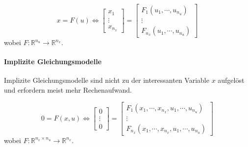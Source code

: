             \begin{equation*}
	            x = F(u) \iff
		            \begin{bmatrix}
			            x _ 1 \\
			            \vdots \\
			            x _ { n _ x }
		            \end{bmatrix}
		        =
			        \begin{bmatrix}
				        F _ 1 (u _ 1, \cdots, u _ { n _ u }) \\
				        \vdots \\
				        F _ { n _ x } (u _ 1, \cdots, u _ { n _ u })
			        \end{bmatrix}
            \end{equation*}
            wobei \( F : \mathbb{R} ^ { n _ u } \rightarrow \mathbb{R} ^ { n _ x } \).
        
        \paragraph{Implizite Gleichungsmodelle}
            Implizite Gleichungsmodelle sind nicht zu der interessanten Variable \( x \) aufgelöst und erfordern meist mehr Rechenaufwand.
        
            \begin{equation*}
	            0 = F(x, u) \iff
		            \begin{bmatrix}
			            0 \\
			            \vdots \\
			            0
		            \end{bmatrix}
	            =
		            \begin{bmatrix}
			            F _ 1 (x _ 1, \cdots, x _ { n _ x }, u _ 1, \cdots, u _ { n _ u }) \\
			            \vdots \\
			            F _ { n _ x } (x _ 1, \cdots, x _ { n _ x }, u _ 1, \cdots, u _ { n _ u })
		            \end{bmatrix}
            \end{equation*}
            wobei \( F : \mathbb{R} ^ { n _ x \times n _ u } \rightarrow \mathbb{R} ^ { n _ x } \).

